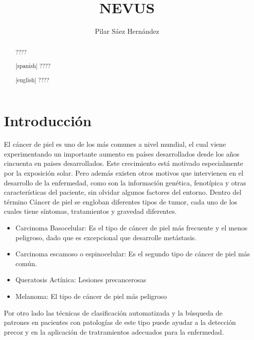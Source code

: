 \documentclass[11pt,spanish,listoffigures,listoftables]{tfgetsinf}
\title{NEVUS \\
				}
\author{Pilar S\'aez Hern\'andez}
\begin{document}

\begin{abstract}
????
\end{abstract}
\begin{abstract}[spanish]
????
\end{abstract}
\begin{abstract}[english]
????
\end{abstract}


\mainmatter


\chapter{Introducci\'on}

El c\'ancer de piel es uno de los m\'as comunes a nivel mundial, el cual viene experimentando un importante aumento en pa\'ises desarrollados desde los a\~nos cincuenta en paises desarrollados. Este crecimiento est\'a motivado especialmente por la exposici\'on solar.  Pero adem\'as existen otros motivos que intervienen en el desarrollo de la enfermedad, como son la informaci\'on gen\'etica, fenot\'ipica y otras caracter\'isticas del paciente, sin olvidar algunos factores del entorno. \newline \newline
Dentro del t\'ermino C\'ancer de piel se engloban diferentes tipos de tumor, cada uno de los cuales tiene s\'intomas, tratamientos y gravedad diferentes. 
\begin{itemize}
\item {Carcinoma Basocelular: Es el tipo de c\'ancer de piel m\'as frecuente y el menos peligroso, dado que es excepcional que desarrolle met\'astasis.}
\item{Carcinoma escamoso o espinocelular: Es el segundo tipo de c\'ancer de piel m\'as com\'un.}
\item{Queratosis Act\'inica: Lesiones precancerosas}
\item{Melanoma: El tipo de c\'ancer de piel m\'as peligroso}
\end{itemize}
Por otro lado las t\'ecnicas de clasificaci\'on automatizada y la b\'usqueda de patrones en pacientes con patolog\'ias de este tipo puede ayudar a la detecci\'on precoz y en la aplicaci\'on de tratramientos adecuados para la enfermedad.
\end{document}

